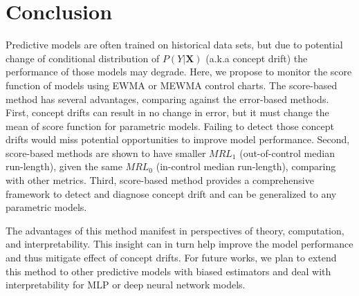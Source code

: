 \documentclass[twoside,11pt]{article}
\begin{document}
\section{Conclusion}
Predictive models are often trained on historical data sets, but due to potential change of conditional distribution of $P (Y|\bm {X})$ (a.k.a concept drift) the performance of those models may degrade. Here, we propose to monitor the score function of models using EWMA or MEWMA control charts. The score-based method has several advantages, comparing against the error-based methods. First, concept drifts can result in no change in error, but it must change the mean of score function for parametric models. Failing to detect those concept drifts would miss potential opportunities to improve model performance. Second, score-based methods are shown to have smaller $MRL_1$ (out-of-control median run-length), given the same $MRL_0$ (in-control median run-length), comparing with other metrics. Third, score-based method provides a comprehensive framework to detect and diagnose concept drift and can be generalized to any parametric models. 

The advantages of this method manifest in perspectives of theory, computation, and interpretability. This insight can in turn help improve the model performance and thus mitigate effect of concept drifts. For future works, we plan to extend this method to other predictive models with biased estimators and deal with interpretability for MLP or deep neural network models.




\acks{}




\end{document}

